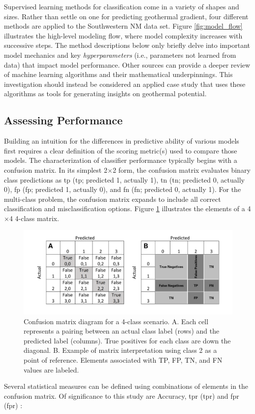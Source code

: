 Supervised learning methods for classification come in a variety of shapes and sizes. Rather than settle on one for predicting geothermal gradient, four different methods are applied to the Southwestern NM data set. Figure \ref{fig:model_flow} illustrates the high-level modeling flow, where model complexity increases with successive steps. The method descriptions below only briefly delve into important model mechanics and key \textit{hyperparameters} (i.e., parameters not learned from data) that impact model performance. Other sources can provide a deeper review of machine learning algorithms and their mathematical underpinnings. This investigation should instead be considered an applied case study that uses these algorithms as tools for generating insights on geothermal potential.

\subsection{Assessing Performance}\label{ch3:modeling_assessments}
Building an intuition for the differences in predictive ability of various models first requires a clear definition of the scoring metric(s) used to compare those models. The characterization of classifier performance typically begins with a confusion matrix. In its simplest 2$\times$2 form, the confusion matrix evaluates binary class predictions as \acrlong{tp} (\acrshort{tp}; predicted 1, actually 1), \acrlong{tn} (\acrshort{tn}; predicted 0, actually 0), \acrlong{fp} (\acrshort{fp}; predicted 1, actually 0), and \acrlong{fn} (\acrshort{fn}; predicted 0, actually 1). For the multi-class problem, the confusion matrix expands to include all correct classification and misclassification options. Figure \ref{fig:confusion_matrix} illustrates the elements of a 4$\times$4 4-class matrix.

\begin{figure}[!htp]
\centering
\includegraphics[width=\textwidth]{templates/images/Figure-Confusion_Matrix.png}
\caption[Example four-class confusion matrix]{Confusion matrix diagram for a 4-class scenario. A. Each cell represents a pairing between an actual class label (rows) and the predicted label (columns). True positives for each class are down the diagonal. B. Example of matrix interpretation using class 2 as a point of reference. Elements associated with TP, FP, TN, and FN values are labeled.}
\label{fig:confusion_matrix}
\end{figure}
Several statistical measures can be defined using combinations of elements in the confusion matrix. Of significance to this study are Accuracy, \acrlong{tpr} (\acrshort{tpr}) and \acrlong{fpr} (\acrshort{fpr}) \citep{tharwat_classification_2020}:

